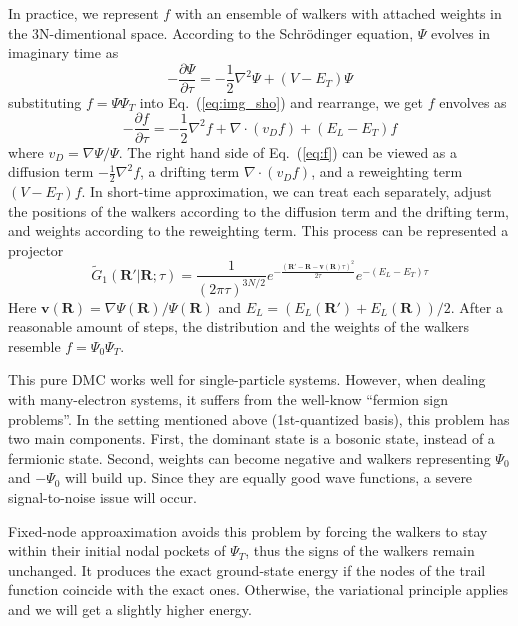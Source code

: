 \documentclass[aps,prl,reprint,groupedaddress]{revtex4-1}
\begin{document}
In practice, we represent $f$ with an ensemble of walkers with attached weights in the 3N-dimentional space.
According to the Schrödinger equation, $\Psi$ evolves in imaginary time as
\begin{equation}
\label{eq:img_sho}
-\frac{\partial \Psi}{\partial \tau} = -\frac{1}{2}\nabla^2\Psi+(V-E_T)\Psi
\end{equation}
%
substituting $f=\Psi\Psi_T$ into Eq.~(\ref{eq:img_sho}) and rearrange, we get $f$ envolves as
\begin{equation}
\label{eq:f}
-\frac{\partial f}{\partial \tau} = -\frac{1}{2}\nabla^2f+\nabla\cdot(v_Df)+(E_L-E_T)f
\end{equation}
where $v_D = \nabla\Psi/\Psi$.
The right hand side of Eq.~(\ref{eq:f}) can be viewed as a diffusion term $-\frac{1}{2}\nabla^2f$, a drifting term $\nabla\cdot(v_Df)$, and a reweighting term $(V-E_T)f$.
In short-time approximation, we can treat each separately, adjust the positions of the walkers according to the diffusion term and the drifting term, and weights according to the reweighting term.
This process can be represented a projector
\begin{equation}
\label{eq:G1t}
\widetilde{G}_1(\bm{R'}|\bm{R};\tau)
= \frac{1}{(2\pi\tau)^{3N/2}} e^{-\frac{(\bm{R'}-\bm{R}-\bm{v}(\bm{R})\tau)^2}{2\tau}} e^{-\left(E_L-E_T\right)\tau}
\end{equation}
Here $\bm{v}(\bm{R}) = \nabla\Psi(\bm{R})/\Psi(\bm{R})$ and $E_L = (E_L(\bm{R'})+E_L(\bm{R}))/2$.
After a reasonable amount of steps, the distribution and the weights of the walkers resemble $f=\Psi_0\Psi_T$.

This pure DMC works well for single-particle systems.
However, when dealing with many-electron systems, it suffers from the well-know ``fermion sign problems''.
In the setting mentioned above (1st-quantized basis), this problem has two main components.
First, the dominant state is a bosonic state, instead of a fermionic state.
Second, weights can become negative and walkers representing $\Psi_0$ and $-\Psi_0$ will build up. Since they are equally good wave functions, a severe signal-to-noise issue will occur.

Fixed-node approaximation avoids this problem by forcing the walkers to stay within their initial nodal pockets of $\Psi_T$, thus the signs of the walkers remain unchanged.
It produces the exact ground-state energy if the nodes of the trail function coincide with the exact ones.
Otherwise, the variational principle applies and we will get a slightly higher energy.
\end{document}
